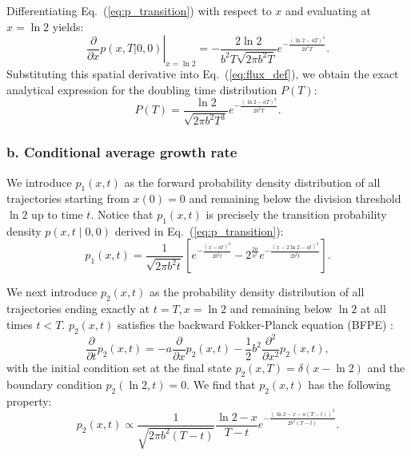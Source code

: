 \documentclass[aps, prl, longbibliography, linenumbers, superscriptaddress]{revtex4-2}
\begin{document}
{Differentiating Eq.~(\ref{eq:p_transition}) with respect to $x$ and evaluating at $x = \ln 2$ yields:
\begin{equation}
\left. \frac{\partial}{\partial x} p(x, T | 0, 0) \right|_{x = \ln 2} = -\frac{2\ln 2}{b^2 T \sqrt{2\pi b^2 T}} e^{-\frac{(\ln 2 - aT)^2}{2b^2 T}}.
\end{equation}
Substituting this spatial derivative into Eq.~(\ref{eq:flux_def}), we obtain the exact analytical expression for the doubling time distribution $P(T)$:
\begin{equation}
P(T) = \frac{\ln 2}{\sqrt{2\pi b^2 T^3}} e^{-\frac{(\ln 2 - aT)^2}{2b^2 T}}.
\label{eq:P_final}
\end{equation}

\subsubsection{b. Conditional average growth rate}
We introduce $p_1(x, t)$ as the forward probability density distribution of all trajectories starting from $x(0) = 0$ and remaining below the division threshold $\ln 2$ up to time $t$. Notice that $p_1(x, t)$ is precisely the transition probability density $p(x, t \mid 0, 0)$ derived in Eq.~(\ref{eq:p_transition}):
\begin{equation}
p_1(x, t) = \frac{1}{\sqrt{2\pi b^2 t}} \left[ e^{-\frac{(x-at)^2}{2b^2 t}} - 2^{\frac{2a}{b^2}} e^{-\frac{(x-2\ln 2-at)^2}{2b^2 t}} \right].
\label{eq:p1_sol}
\end{equation}

We next introduce $p_2(x, t)$ as the probability density distribution of all trajectories ending exactly at $t = T, x = \ln 2$ and remaining below $\ln 2$ at all times $t < T$. $p_2(x, t)$ satisfies the backward Fokker-Planck equation (BFPE) \cite{Gardiner2009stochastic}:
\begin{equation}
\frac{\partial}{\partial t}p_2(x, t) = -a\frac{\partial}{\partial x}p_2(x, t) - \frac{1}{2}b^2\frac{\partial^2}{\partial x^2}p_2(x, t),
\end{equation}
with the initial condition set at the final state $p_2 (x, T) = \delta(x-\ln 2)$ and the boundary condition $p_2 (\ln 2, t) = 0$. We find that $p_2(x, t)$ has the following property:
\begin{equation}
p_2 (x, t) \propto \frac{1}{\sqrt{2\pi b^2 (T-t)}} \frac{\ln 2 - x}{T-t} e^{-\frac{(\ln 2 - x - a(T-t))^2}{2b^2 (T-t)}}.
\label{eq:p2_sol}
\end{equation}
}
\end{document}
